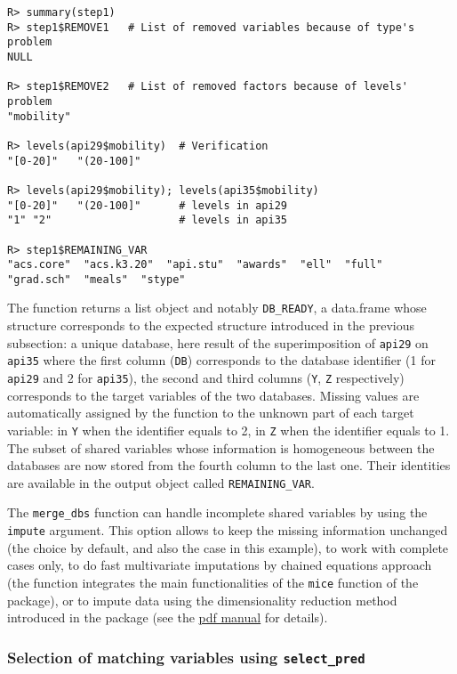 \begin{verbatim}
R> summary(step1)
R> step1$REMOVE1   # List of removed variables because of type's problem
NULL

R> step1$REMOVE2   # List of removed factors because of levels' problem
"mobility"

R> levels(api29$mobility)  # Verification
"[0-20]"   "(20-100]"

R> levels(api29$mobility); levels(api35$mobility)
"[0-20]"   "(20-100]"      # levels in api29
"1" "2"                    # levels in api35

R> step1$REMAINING_VAR
"acs.core"  "acs.k3.20"  "api.stu"  "awards"  "ell"  "full"
"grad.sch"  "meals"  "stype"
\end{verbatim}

The function returns a list object and notably \texttt{DB\_READY}, a data.frame whose structure corresponds to the expected structure introduced in the previous subsection: a unique database, here result of the superimposition of \texttt{api29} on \texttt{api35} where the first column (\texttt{DB}) corresponds to the database identifier (1 for \texttt{api29} and 2 for \texttt{api35}), the second and third columns (\texttt{Y}, \texttt{Z} respectively) corresponds to the target variables of the two databases. Missing values are automatically assigned by the function to the unknown part of each target variable: in \texttt{Y} when the identifier equals to 2, in \texttt{Z} when the identifier equals to 1. The subset of shared variables whose information is homogeneous between the databases are now stored from the fourth column to the last one. Their identities are available in the output object called \texttt{REMAINING\_VAR}.

The \texttt{merge\_dbs} function can handle incomplete shared variables by using the \texttt{impute} argument. This
option allows to keep the missing information unchanged (the choice by default, and also the case in this
example), to work with complete cases only, to do fast multivariate imputations by chained equations approach
(the function integrates the main functionalities of the \texttt{mice} function of the  package), or to impute data using the dimensionality reduction method introduced in the  package (see the \href{https://cran.r-project.org//web//packages//OTrecod//OTrecod.pdf}{pdf manual} for details).

\hypertarget{selection-of-matching-variables-using-select_pred}{%
\subsubsection{\texorpdfstring{Selection of matching variables using \texttt{select\_pred}}{Selection of matching variables using select\_pred}}\label{selection-of-matching-variables-using-select_pred}}

